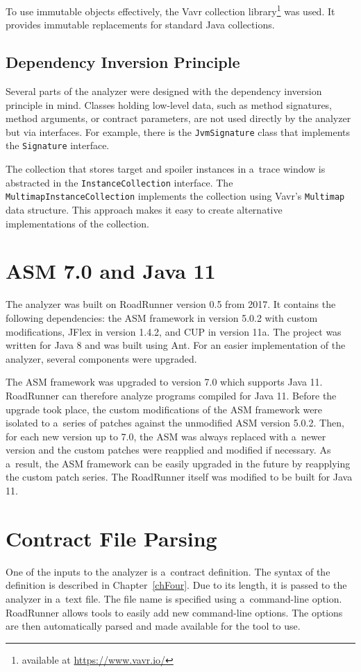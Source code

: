 To use immutable objects effectively, the Vavr collection
library\footnote{available at \url{https://www.vavr.io/}} was used. It provides
immutable replacements for standard Java collections.

\subsection{Dependency Inversion Principle}
Several parts of the analyzer were designed with the dependency inversion
principle in mind. Classes holding low-level data, such as method signatures,
method arguments, or contract parameters, are not used directly by the analyzer
but via interfaces. For example, there is the \texttt{JvmSignature} class that
implements the \texttt{Signature} interface.

The collection that stores target and spoiler instances in a~trace window is
abstracted in the \texttt{InstanceCollection} interface. The
\texttt{MultimapInstanceCollection} implements the collection using Vavr's
\texttt{Multimap} data structure. This approach makes it easy to create
alternative implementations of the collection.

\section{ASM 7.0 and Java 11}
\label{asmAndJava}
The analyzer was built on RoadRunner version 0.5 from 2017. It contains the
following dependencies: the ASM framework in version 5.0.2 with custom
modifications, JFlex in version 1.4.2, and CUP in version 11a. The project was
written for Java 8 and was built using Ant. For an easier implementation of the
analyzer, several components were upgraded.

The ASM framework was upgraded to version 7.0 which supports Java 11. RoadRunner
can therefore analyze programs compiled for Java 11. Before the upgrade took
place, the custom modifications of the ASM framework were isolated to a~series
of patches against the unmodified ASM version 5.0.2. Then, for each new version
up to 7.0, the ASM was always replaced with a~newer version and the custom
patches were reapplied and modified if necessary. As a~result, the ASM framework
can be easily upgraded in the future by reapplying the custom patch series. The
RoadRunner itself was modified to be built for Java 11.

\section{Contract File Parsing}
\label{cfParsing}
One of the inputs to the analyzer is a~contract definition. The syntax of the
definition is described in Chapter~\ref{chFour}. Due to its length, it is passed
to the analyzer in a~text file. The file name is specified using a~command-line
option. RoadRunner allows tools to easily add new command-line options. The
options are then automatically parsed and made available for the tool to use.

